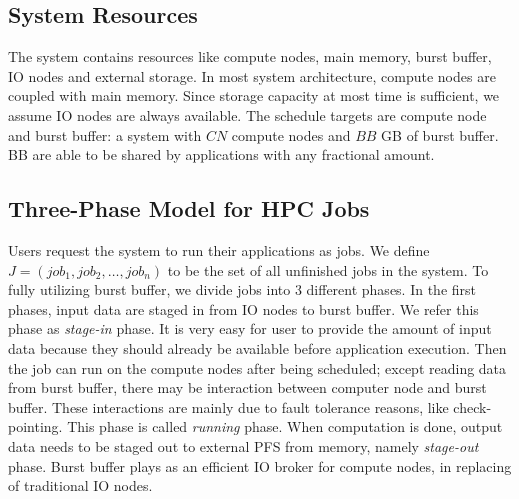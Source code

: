 \subsection{System Resources}
The system contains resources like compute nodes, main memory, burst buffer,
IO nodes and external storage.
In most system architecture, compute nodes are coupled with main memory.
Since storage capacity at most time is sufficient, we assume IO nodes are always available.
The schedule targets are compute node and burst buffer:
a system with $CN$ compute nodes and $BB$ GB of burst buffer.
BB are able to be shared by applications with any fractional amount.

\subsection{Three-Phase Model for HPC Jobs}
Users request the system to run their applications as jobs.
We define $J = (job_1, job_2, \ldots, job_n)$ to be the set of all unfinished jobs in the system.
To fully utilizing burst buffer, we divide jobs into 3 different phases.
In the first phases, input data are staged in from IO nodes to burst buffer.
We refer this phase as \textit{stage-in} phase.
It is very easy for user to provide the amount of input data
because they should already be available before application execution. 
Then the job can run on the compute nodes after being scheduled;
except reading data from burst buffer, there may be interaction between 
computer node and burst buffer.
These interactions are mainly due to fault tolerance reasons, like check-pointing.
This phase is called \textit{running} phase.
When computation is done, output data needs to be staged out to external PFS from memory,
namely \textit{stage-out} phase.
Burst buffer plays as an efficient IO broker for compute nodes,
in replacing of traditional IO nodes.


